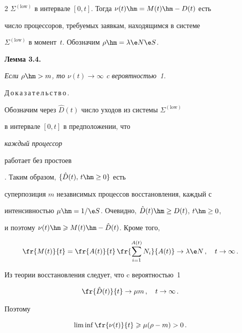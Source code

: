 \begin{multicols}{2}
$\Sigma^{(\mathrm{low})}$ в интервале $[0,t]$. Тогда $\nu(t)\hm=M(t)\hm-D(t)$  есть

чис\-ло процессоров, требуемых заявкам, находящимся в сис\-те\-ме

$\Sigma^{(\mathrm{low})}$ в момент~$t$. Обозначим $\rho\hm=\lambda \e N\e S$.



\medskip



\noindent

\textbf{Лемма 3.4.}

\textit{Если  $\rho\hm>m$, то $\nu(t)\to \infty$ c вероят\-ностью~1.}

\medskip



\noindent

Д\,о\,к\,а\,з\,а\,т\,е\,л\,ь\,с\,т\,в\,о\,.\

Обозначим через $\hat D(t)$ число уходов из системы $\Sigma^{(\mathrm{low})}$

в интервале $[0,t]$ в предположении, что {\it каждый  процессор

работает без простоев}.  Таким образом, $\{\hat D(t),\,t\hm\ge0\}$ есть

суперпозиция $m$ независимых процессов восстановления, каждый с

интенсивностью $\mu\hm=1/\e S$. Очевидно, $\hat D(t)\hm\ge D(t)$, $t\hm\ge0$,

и поэтому $\nu(t)\hm\geqslant M(t)\hm-\hat D(t)$.  Кроме того,

\begin{equation*}

\fr{M(t)}{t}=\fr{A(t)}{t}\, \fr{\sum_{i=1}^{A(t)} 

N_{i}}{A(t)} \to \lambda \e N\,,\quad t\to \infty\,.

\end{equation*}

Из теории восстановления следует, что c вероят\-ностью~1

\begin{equation*}

\fr{\hat D(t)}{t}\to \mu m\,,\quad t\to\infty\,.

\end{equation*}

Поэтому

\begin{equation*}

\liminf \fr{\nu(t)}{t}\geqslant  \mu(\rho-m)>0\,.


\end{equation*}
\end{multicols}
